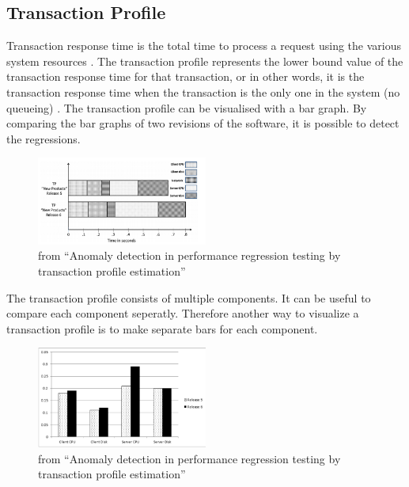\subsection{Transaction Profile}
Transaction response time is the total time to process a request using the various
system resources \cite{jain2008art}. The transaction profile represents the lower bound value of the transaction response time for that transaction, or in other words, it is the
transaction response time when the transaction is the only one in the system (no queueing) \cite{ghaith2015anomaly}.\newline
The transaction profile can be visualised with a bar graph. By comparing the bar graphs of two revisions of the software, it is possible to detect the regressions.

\begin{figure}[h]
\begin{center}
  \includegraphics[width=0.5\textwidth]{Figures/TP.png}
\end{center}
  \caption{from ``Anomaly detection in performance regression testing by transaction profile estimation''\cite{ghaith2015anomaly}}

\end{figure}

The transaction profile consists of multiple components. It can be useful to compare each component seperatly. Therefore another way to visualize a transaction profile is to make separate bars for each component.

\begin{figure}[h]
\begin{center}
  \includegraphics[width=0.5\textwidth]{Figures/TPbars.png}
\end{center}
  \caption{from ``Anomaly detection in performance regression testing by transaction profile estimation''\cite{ghaith2015anomaly}}

\end{figure}
\newpage
